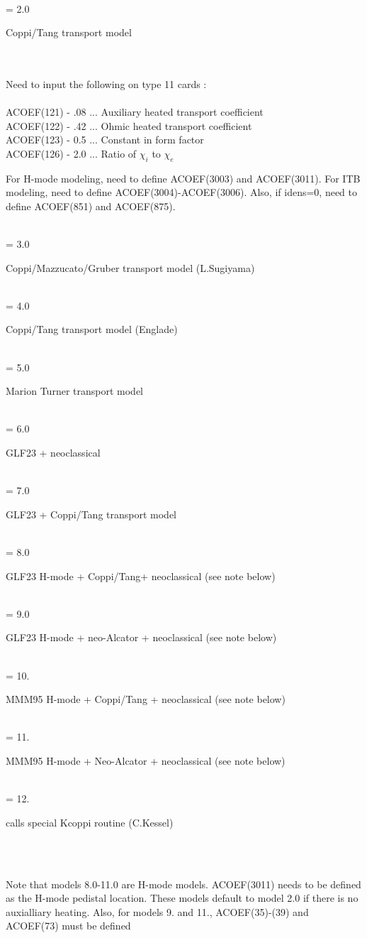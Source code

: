 \begin{tabbing}
 \\ 
\> = 2.0 \> \parbox[t]{\width}{Coppi/Tang transport model}\\ 
 \\ 
\> \> Need to input the following on type 11 cards :\\
 \\ 
\> \> ACOEF(121) - .08 ... Auxiliary heated transport coefficient\\
\> \> ACOEF(122) - .42  ... Ohmic heated transport coefficient \\
\> \> ACOEF(123) - 0.5  ... Constant in form factor\\
\> \> ACOEF(126) - 2.0  ... Ratio of $\chi_i$ to $\chi_e$  \\
\> \> \parbox[t]{\width} {For H-mode modeling, need to define 
      ACOEF(3003) and ACOEF(3011).  For ITB modeling, need to define
      ACOEF(3004)-ACOEF(3006).  Also, if idens=0, need to define ACOEF(851) 
      and ACOEF(875). }
\\

\> = 3.0 \> \parbox[t]{\width}{Coppi/Mazzucato/Gruber transport model (L.Sugiyama)} \\   
\> = 4.0 \> \parbox[t]{\width}{Coppi/Tang transport model (Englade)} \\ 
\> = 5.0 \> \parbox[t]{\width}{Marion Turner transport model} \\ 
\> = 6.0 \> \parbox[t]{\width}{GLF23 + neoclassical} \\ 
\> = 7.0 \> \parbox[t]{\width}{GLF23 + Coppi/Tang transport model} \\ 
\> = 8.0 \> \parbox[t]{\width}{GLF23 H-mode + Coppi/Tang+ neoclassical (see note below)} \\ 
\> = 9.0 \> \parbox[t]{\width}{GLF23 H-mode + neo-Alcator + neoclassical (see note below)} \\ 
\> = 10. \> \parbox[t]{\width}{MMM95 H-mode + Coppi/Tang + neoclassical (see note below)} \\ 
\> = 11. \> \parbox[t]{\width}{MMM95 H-mode + Neo-Alcator + neoclassical (see note below)} \\ 
\> = 12. \> \parbox[t]{\width}{calls special Kcoppi routine (C.Kessel)} \\ 
\\
\parbox[t]{\width}{Note that models 8.0-11.0 are H-mode models.  ACOEF(3011)
 needs to be defined as the H-mode pedistal location.   These models 
default to model 2.0 if there is no auxialliary 
heating.  Also, for models 9. and 11., ACOEF(35)-(39) and ACOEF(73) 
must be defined} \\

\end{tabbing}
